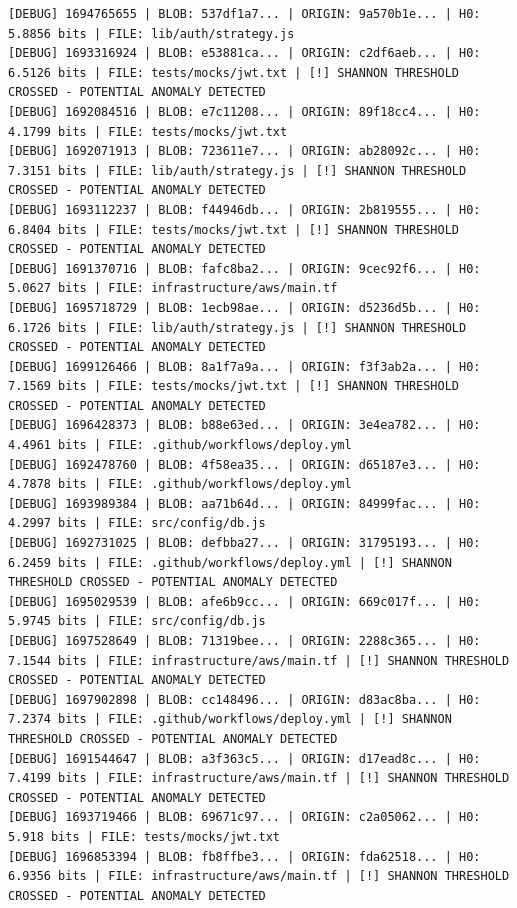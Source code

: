 \documentclass[12pt, a4paper, oneside]{report}
\begin{document}
\begin{lstlisting}[basicstyle=\tiny\ttfamily]
[DEBUG] 1694765655 | BLOB: 537df1a7... | ORIGIN: 9a570b1e... | H0: 5.8856 bits | FILE: lib/auth/strategy.js
[DEBUG] 1693316924 | BLOB: e53881ca... | ORIGIN: c2df6aeb... | H0: 6.5126 bits | FILE: tests/mocks/jwt.txt | [!] SHANNON THRESHOLD CROSSED - POTENTIAL ANOMALY DETECTED
[DEBUG] 1692084516 | BLOB: e7c11208... | ORIGIN: 89f18cc4... | H0: 4.1799 bits | FILE: tests/mocks/jwt.txt
[DEBUG] 1692071913 | BLOB: 723611e7... | ORIGIN: ab28092c... | H0: 7.3151 bits | FILE: lib/auth/strategy.js | [!] SHANNON THRESHOLD CROSSED - POTENTIAL ANOMALY DETECTED
[DEBUG] 1693112237 | BLOB: f44946db... | ORIGIN: 2b819555... | H0: 6.8404 bits | FILE: tests/mocks/jwt.txt | [!] SHANNON THRESHOLD CROSSED - POTENTIAL ANOMALY DETECTED
[DEBUG] 1691370716 | BLOB: fafc8ba2... | ORIGIN: 9cec92f6... | H0: 5.0627 bits | FILE: infrastructure/aws/main.tf
[DEBUG] 1695718729 | BLOB: 1ecb98ae... | ORIGIN: d5236d5b... | H0: 6.1726 bits | FILE: lib/auth/strategy.js | [!] SHANNON THRESHOLD CROSSED - POTENTIAL ANOMALY DETECTED
[DEBUG] 1699126466 | BLOB: 8a1f7a9a... | ORIGIN: f3f3ab2a... | H0: 7.1569 bits | FILE: tests/mocks/jwt.txt | [!] SHANNON THRESHOLD CROSSED - POTENTIAL ANOMALY DETECTED
[DEBUG] 1696428373 | BLOB: b88e63ed... | ORIGIN: 3e4ea782... | H0: 4.4961 bits | FILE: .github/workflows/deploy.yml
[DEBUG] 1692478760 | BLOB: 4f58ea35... | ORIGIN: d65187e3... | H0: 4.7878 bits | FILE: .github/workflows/deploy.yml
[DEBUG] 1693989384 | BLOB: aa71b64d... | ORIGIN: 84999fac... | H0: 4.2997 bits | FILE: src/config/db.js
[DEBUG] 1692731025 | BLOB: defbba27... | ORIGIN: 31795193... | H0: 6.2459 bits | FILE: .github/workflows/deploy.yml | [!] SHANNON THRESHOLD CROSSED - POTENTIAL ANOMALY DETECTED
[DEBUG] 1695029539 | BLOB: afe6b9cc... | ORIGIN: 669c017f... | H0: 5.9745 bits | FILE: src/config/db.js
[DEBUG] 1697528649 | BLOB: 71319bee... | ORIGIN: 2288c365... | H0: 7.1544 bits | FILE: infrastructure/aws/main.tf | [!] SHANNON THRESHOLD CROSSED - POTENTIAL ANOMALY DETECTED
[DEBUG] 1697902898 | BLOB: cc148496... | ORIGIN: d83ac8ba... | H0: 7.2374 bits | FILE: .github/workflows/deploy.yml | [!] SHANNON THRESHOLD CROSSED - POTENTIAL ANOMALY DETECTED
[DEBUG] 1691544647 | BLOB: a3f363c5... | ORIGIN: d17ead8c... | H0: 7.4199 bits | FILE: infrastructure/aws/main.tf | [!] SHANNON THRESHOLD CROSSED - POTENTIAL ANOMALY DETECTED
[DEBUG] 1693719466 | BLOB: 69671c97... | ORIGIN: c2a05062... | H0: 5.918 bits | FILE: tests/mocks/jwt.txt
[DEBUG] 1696853394 | BLOB: fb8ffbe3... | ORIGIN: fda62518... | H0: 6.9356 bits | FILE: infrastructure/aws/main.tf | [!] SHANNON THRESHOLD CROSSED - POTENTIAL ANOMALY DETECTED

\end{lstlisting}
\end{document}
